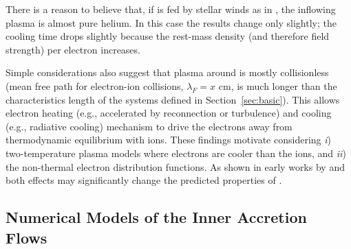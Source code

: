 There is a reason to believe that, if \sgra is fed by stellar winds as
in \citet{2019MNRAS.482L.123R}, the inflowing plasma is almost pure
helium. In this case the results change only slightly; the cooling time drops
slightly because the rest-mass density (and therefore field strength)
per electron increases.

Simple considerations also suggest that plasma around \sgra is mostly collisionless (mean free path for electron-ion collisions, $\lambda_F=x$ cm, is much longer than the characteristics length of the systems defined in Section~\ref{sec:basic}).
This allows electron heating (e.g., accelerated by reconnection or turbulence) and
cooling (e.g., radiative cooling) mechanism to drive the electrons
away from thermodynamic equilibrium with ions.
These findings motivate considering \emph{i}) two-temperature plasma models where electrons are cooler than the
ions, and \emph{ii}) the non-thermal electron distribution functions.
As shown in early works by
\citet{1998ApJ...492..554N} and \citet{2000ApJ...541..234O} both
effects may significantly change the predicted properties of \sgra.








\subsection{Numerical Models of the Inner Accretion Flows}


